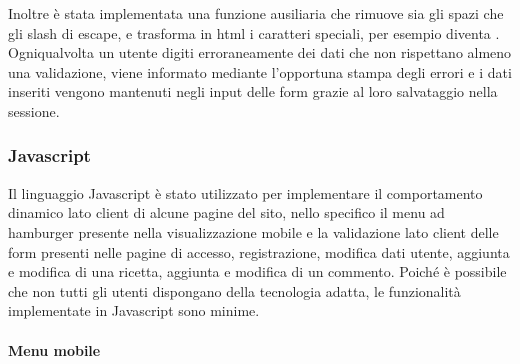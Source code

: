 Inoltre è stata implementata una funzione ausiliaria  che rimuove sia gli spazi che gli slash di escape, e trasforma in html i caratteri speciali, per esempio  diventa .
Ogniqualvolta un utente digiti erroraneamente dei dati che non rispettano almeno una validazione, viene informato mediante l'opportuna stampa degli errori e i dati inseriti vengono mantenuti negli input delle form grazie al loro salvataggio nella sessione.

\subsubsection{Javascript}\label{subs:javascript}
Il linguaggio Javascript è stato utilizzato per implementare il comportamento dinamico lato client di alcune pagine del sito, nello specifico il menu ad hamburger presente nella visualizzazione mobile e la validazione lato client delle form presenti nelle pagine di accesso, registrazione, modifica dati utente, aggiunta e modifica di una ricetta, aggiunta e modifica di un commento.
Poiché è possibile che non tutti gli utenti dispongano della tecnologia adatta, le funzionalità implementate in Javascript sono minime.
\paragraph{Menu mobile}\label{par:menu_mobile}
